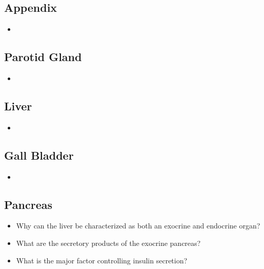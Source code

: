 \begin{itemize}
  \subsection{Appendix}\label{Appendix}
  \begin{multicols}{2}
  \begin{itemize}
    \item 
  \end{itemize}
  \end{multicols}

  \subsection{Parotid Gland}\label{Parotid Gland}
  \begin{multicols}{2}
  \begin{itemize}
    \item 
  \end{itemize}
  \end{multicols}
  
  \subsection{Liver}\label{Liver}
  \begin{multicols}{2}
  \begin{itemize}
    \item 
  \end{itemize}
  \end{multicols}
  
  \subsection{Gall Bladder}\label{Gall Bladder}
  \begin{multicols}{2}
  \begin{itemize}
    \item 
  \end{itemize}
  \end{multicols}
  
  \subsection{Pancreas}\label{Pancreas}
  \begin{multicols}{2}
  \begin{itemize}
    \item Why can the liver be characterized as both an exocrine and endocrine organ?
    \item What are the secretory products of the exocrine pancreas?
    \item What is the major factor controlling insulin secretion?
  \end{itemize}
  \end{multicols}

\end{itemize}
